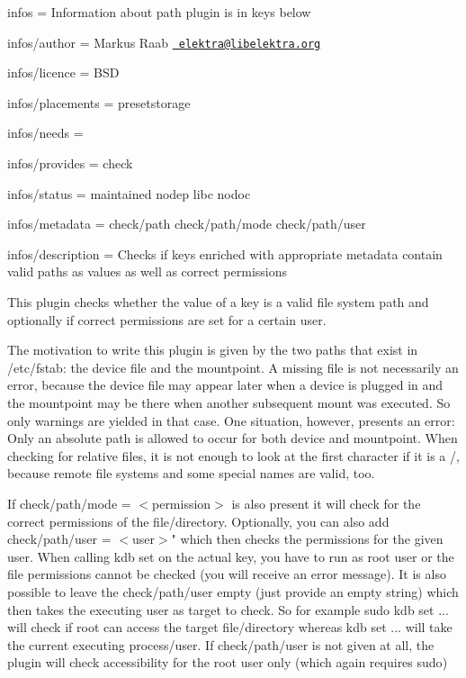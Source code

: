 
\begin{DoxyItemize}
\item infos = Information about path plugin is in keys below
\item infos/author = Markus Raab \href{mailto:elektra@libelektra.org}{\texttt{ elektra@libelektra.\+org}}
\item infos/licence = B\+SD
\item infos/placements = presetstorage
\item infos/needs =
\item infos/provides = check
\item infos/status = maintained nodep libc nodoc
\item infos/metadata = check/path check/path/mode check/path/user
\item infos/description = Checks if keys enriched with appropriate metadata contain valid paths as values as well as correct permissions
\end{DoxyItemize}

This plugin checks whether the value of a key is a valid file system path and optionally if correct permissions are set for a certain user.

The motivation to write this plugin is given by the two paths that exist in /etc/fstab\+: the device file and the mountpoint. A missing file is not necessarily an error, because the device file may appear later when a device is plugged in and the mountpoint may be there when another subsequent mount was executed. So only warnings are yielded in that case. One situation, however, presents an error\+: Only an absolute path is allowed to occur for both device and mountpoint. When checking for relative files, it is not enough to look at the first character if it is a {\ttfamily /}, because remote file systems and some special names are valid, too.

If {\ttfamily check/path/mode = $<$permission$>$} is also present it will check for the correct permissions of the file/directory. Optionally, you can also add {\ttfamily check/path/user = $<$user$>$"} which then checks the permissions for the given user. When calling {\ttfamily kdb set} on the actual key, you have to run as {\ttfamily root} user or the file permissions cannot be checked (you will receive an error message). It is also possible to leave the {\ttfamily check/path/user} empty (just provide an empty string) which then takes the executing user as target to check. So for example {\ttfamily sudo kdb set ...} will check if {\ttfamily root} can access the target file/directory whereas {\ttfamily kdb set ...} will take the current executing process/user. If {\ttfamily check/path/user} is not given at all, the plugin will check accessibility for the {\ttfamily root} user only (which again requires {\ttfamily sudo})

